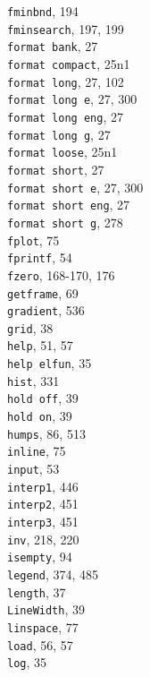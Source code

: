 \documentclass[../main.tex]{subfiles}
\begin{document}
\begin{multicols}{3}
    \texttt{fminbnd}, 194\\
    \texttt{fminsearch}, 197, 199\\
    \texttt{format bank}, 27\\
    \texttt{format compact}, 25n1\\
    \texttt{format long}, 27, 102\\
    \texttt{format long e}, 27, 300\\
    \texttt{format long eng}, 27\\
    \texttt{format long g}, 27\\
    \texttt{format loose}, 25n1\\
    \texttt{format short}, 27\\
    \texttt{format short e}, 27, 300\\
    \texttt{format short eng}, 27\\
    \texttt{format short g}, 278\\
    \texttt{fplot}, 75\\
    \texttt{fprintf}, 54\\
    \texttt{fzero}, 168-170, 176\\
    \texttt{getframe}, 69\\
    \texttt{gradient}, 536\\
    \texttt{grid}, 38\\
    \texttt{help}, 51, 57\\
    \texttt{help elfun}, 35\\
    \texttt{hist}, 331\\
    \texttt{hold off}, 39\\
    \texttt{hold on}, 39\\
    \texttt{humps}, 86, 513\\
    \texttt{inline}, 75\\
    \texttt{input}, 53\\
    \texttt{interp1}, 446\\
    \texttt{interp2}, 451\\
    \texttt{interp3}, 451\\
    \texttt{inv}, 218, 220\\
    \texttt{isempty}, 94\\
    \texttt{legend}, 374, 485\\
    \texttt{length}, 37\\
    \texttt{LineWidth}, 39\\
    \texttt{linspace}, 77\\
    \texttt{load}, 56, 57\\
    \texttt{log}, 35\\

\end{multicols}
\end{document}
